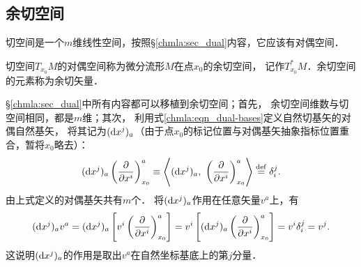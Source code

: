 \subsection{余切空间}
切空间是一个$m$维线性空间，按照\S\ref{chmla:sec_dual}内容，它应该有对偶空间．
\begin{definition}
    切空间$T_{x_0}M$的对偶空间称为微分流形$M$在点$x_0$的{\heiti 余切空间}，
    记作$T_{x_0}^{*}M$．余切空间的元素称为{\heiti 余切矢量}．
\end{definition}
\S\ref{chmla:sec_dual}中所有内容都可以移植到余切空间；首先，
余切空间维数与切空间相同，都是$m$维；其次，
利用式\eqref{chmla:eqn_dual-bases}定义自然切基矢的{\heiti 对偶自然基矢}，
将其记为$({\rm d}x^j)_a$（由于点${x_0}$的标记位置与对偶基矢抽象指标位置重合，暂将${x_0}$略去）：
\begin{equation}\label{chdm:eqn_dual-natural-bases}
    ({\rm d}x^j)_a \left(\frac{\partial }{\partial x^i}\right)^a_{x_0} \equiv 
    \left< ({\rm d}x^j)_a , \   \left(\frac{\partial }{\partial x^i}\right)^a_{x_0}\right>
    \overset{\mathrm {def}}{=} \delta^j_i .
\end{equation}
由上式定义的对偶基矢共有$m$个．
将$({\rm d}x^j)_a$作用在任意矢量$v^a$上，有
\begin{equation*}
    ({\rm d}x^j)_a v^a =  ({\rm d}x^j)_a 
       \left[v^i \left(\frac{\partial }{\partial x^i}\right)^a_{x_0}\right] 
    =  v^i \left[ ({\rm d}x^j)_a  \left(\frac{\partial }{\partial x^i}\right)^a_{x_0}\right] 
    =  v^i \delta^j_i = v^j .
\end{equation*}
这说明$({\rm d}x^j)_a$的作用是取出$v^a$在自然坐标基底上的第$j$分量．

